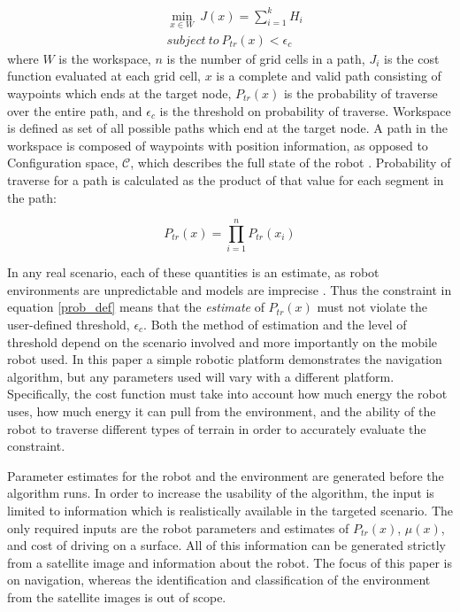 \documentclass[journal]{IEEEtran}
\begin{document}
\begin{align}
\label{prob_def}
&\min_{x\in W}\ J(x) = \sum_{i=1}^{k} H_i \\
&subject\ to\  P_{tr}(x)<\epsilon_c
\end{align}
where $W$ is the workspace, $n$ is the number of grid cells in a path, $J_i$ is the cost function evaluated at each grid cell, $x$ is a complete and valid path consisting of waypoints which ends at the target node, $P_{tr}(x)$ is the probability of traverse over the entire path, and $\epsilon_c$ is the threshold on probability of traverse. 
Workspace is defined as set of all possible paths which end at the target node. A path in the workspace is composed of waypoints with position information, as opposed to Configuration space, $\mathcal{C}$, which describes the full state of the robot \cite{lavalle2006planning}. Probability of traverse for a path is calculated as the product of that value for each segment in the path:


\begin{equation}
\label{Ptr}
P_{tr}(x) = \prod_{i=1}^n P_{tr}(x_i)
\end{equation}

In any real scenario, each of these quantities is an estimate, as robot environments are unpredictable and models are imprecise \cite{thrun2005probabilistic}. 
Thus the constraint in equation \ref{prob_def} means that the \textit{estimate} of $P_{tr}(x)$ must not violate the user-defined threshold, $\epsilon_c$. 
Both the method of estimation and the level of threshold depend on the scenario involved and more importantly on the mobile robot used. 
In this paper a simple robotic platform demonstrates the navigation algorithm, but any parameters used will vary with a different platform. 
Specifically, the cost function must take into account how much energy the robot uses, how much energy it can pull from the environment, and the ability of the robot to traverse different types of terrain in order to accurately evaluate the constraint.

Parameter estimates for the robot and the environment are generated  before the algorithm runs. 
In order to increase the usability of the algorithm, the input is limited to information which is realistically available in the targeted scenario. 
The only required inputs are the robot parameters and estimates of $P_{tr}(x)$, $\mu(x)$, and cost of driving on a surface. All of this information can be generated strictly from a satellite image and information about the robot. 
The focus of this paper is on navigation, whereas the identification and classification of the environment from the satellite images is out of scope.
\end{document}
